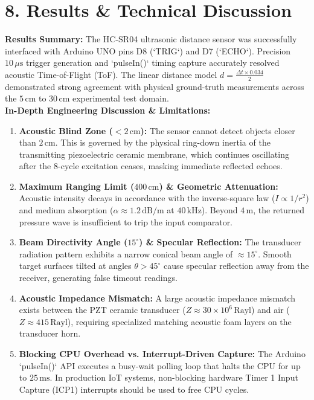 \documentclass[10pt,a4paper]{article}
\begin{document}
\section*{8. Results \& Technical Discussion}
\noindent\textbf{Results Summary:} The HC-SR04 ultrasonic distance sensor was successfully interfaced with Arduino UNO pins D8 (`TRIG`) and D7 (`ECHO`). Precision $10\,\mu\text{s}$ trigger generation and `pulseIn()` timing capture accurately resolved acoustic Time-of-Flight (ToF). The linear distance model $d = \frac{\Delta t \times 0.034}{2}$ demonstrated strong agreement with physical ground-truth measurements across the $5\,\text{cm}$ to $30\,\text{cm}$ experimental test domain.\\[0.06cm]
\textbf{In-Depth Engineering Discussion \& Limitations:}
\begin{enumerate}[leftmargin=*]
    \item \textbf{Acoustic Blind Zone ($< 2\,\text{cm}$):} The sensor cannot detect objects closer than $2\,\text{cm}$. This is governed by the physical ring-down inertia of the transmitting piezoelectric ceramic membrane, which continues oscillating after the 8-cycle excitation ceases, masking immediate reflected echoes.
    \item \textbf{Maximum Ranging Limit ($400\,\text{cm}$) \& Geometric Attenuation:} Acoustic intensity decays in accordance with the inverse-square law ($I \propto 1/r^2$) and medium absorption ($\alpha \approx 1.2\,\text{dB/m}$ at $40\,\text{kHz}$). Beyond $4\,\text{m}$, the returned pressure wave is insufficient to trip the input comparator.
    \item \textbf{Beam Directivity Angle ($15^\circ$) \& Specular Reflection:} The transducer radiation pattern exhibits a narrow conical beam angle of $\approx 15^\circ$. Smooth target surfaces tilted at angles $\theta > 45^\circ$ cause specular reflection away from the receiver, generating false timeout readings.
    \item \textbf{Acoustic Impedance Mismatch:} A large acoustic impedance mismatch exists between the PZT ceramic transducer ($Z \approx 30 \times 10^6\,\text{Rayl}$) and air ($Z \approx 415\,\text{Rayl}$), requiring specialized matching acoustic foam layers on the transducer horn.
    \item \textbf{Blocking CPU Overhead vs. Interrupt-Driven Capture:} The Arduino `pulseIn()` API executes a busy-wait polling loop that halts the CPU for up to $25\,\text{ms}$. In production IoT systems, non-blocking hardware Timer 1 Input Capture (ICP1) interrupts should be used to free CPU cycles.
\end{enumerate}
\end{document}
